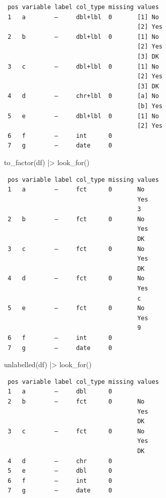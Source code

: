 \documentclass[
  letterpaper,
  DIV=11,
  numbers=noendperiod,
  oneside]{scrreprt}
\newenvironment{Shaded}{\begin{snugshade}}{\end{snugshade}}
\newcommand{\FunctionTok}[1]{\textcolor[rgb]{0.28,0.35,0.67}{#1}}
\newcommand{\NormalTok}[1]{\textcolor[rgb]{0.00,0.23,0.31}{#1}}
\newcommand{\SpecialCharTok}[1]{\textcolor[rgb]{0.37,0.37,0.37}{#1}}
\begin{document}
\begin{verbatim}
 pos variable label col_type missing values 
 1   a        —     dbl+lbl  0       [1] No 
                                     [2] Yes
 2   b        —     dbl+lbl  0       [1] No 
                                     [2] Yes
                                     [3] DK 
 3   c        —     dbl+lbl  0       [1] No 
                                     [2] Yes
                                     [3] DK 
 4   d        —     chr+lbl  0       [a] No 
                                     [b] Yes
 5   e        —     dbl+lbl  0       [1] No 
                                     [2] Yes
 6   f        —     int      0              
 7   g        —     date     0              
\end{verbatim}

\begin{Shaded}
\begin{Highlighting}[]
\FunctionTok{to\_factor}\NormalTok{(df) }\SpecialCharTok{|\textgreater{}} \FunctionTok{look\_for}\NormalTok{()}
\end{Highlighting}
\end{Shaded}

\begin{verbatim}
 pos variable label col_type missing values
 1   a        —     fct      0       No    
                                     Yes   
                                     3     
 2   b        —     fct      0       No    
                                     Yes   
                                     DK    
 3   c        —     fct      0       No    
                                     Yes   
                                     DK    
 4   d        —     fct      0       No    
                                     Yes   
                                     c     
 5   e        —     fct      0       No    
                                     Yes   
                                     9     
 6   f        —     int      0             
 7   g        —     date     0             
\end{verbatim}

\begin{Shaded}
\begin{Highlighting}[]
\FunctionTok{unlabelled}\NormalTok{(df) }\SpecialCharTok{|\textgreater{}} \FunctionTok{look\_for}\NormalTok{()}
\end{Highlighting}
\end{Shaded}

\begin{verbatim}
 pos variable label col_type missing values
 1   a        —     dbl      0             
 2   b        —     fct      0       No    
                                     Yes   
                                     DK    
 3   c        —     fct      0       No    
                                     Yes   
                                     DK    
 4   d        —     chr      0             
 5   e        —     dbl      0             
 6   f        —     int      0             
 7   g        —     date     0             
\end{verbatim}
\end{document}
